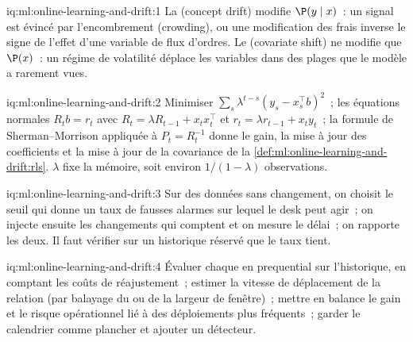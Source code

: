 \begin{solution}{iq:ml:online-learning-and-drift:1}
La  (concept drift) modifie $\P(y\mid x)$~: un signal est évincé par l'encombrement (crowding), ou une modification des frais inverse le signe de l'effet
d'une variable de flux d'ordres. Le  (covariate shift) ne modifie que $\P(x)$~: un régime de volatilité déplace les variables dans des plages que le modèle a rarement vues.
\end{solution}

\begin{solution}{iq:ml:online-learning-and-drift:2}
Minimiser $\sum_s\lambda^{t-s}(y_s - x_s^\top b)^2$~; les équations normales $R_tb = r_t$ avec $R_t = \lambda R_{t-1} + x_tx_t^\top$
et $r_t = \lambda r_{t-1} + x_ty_t$~; la formule de Sherman--Morrison appliquée à $P_t = R_t^{-1}$ donne le gain, la mise à jour des coefficients et la
mise à jour de la covariance de la \cref{def:ml:online-learning-and-drift:rls}. $\lambda$ fixe la mémoire, soit environ $1/(1-\lambda)$
observations.
\end{solution}

\begin{solution}{iq:ml:online-learning-and-drift:3}
Sur des données sans changement, on choisit le seuil qui donne un taux de fausses alarmes sur lequel le desk peut agir~; on injecte ensuite les changements qui
comptent et on mesure le délai~; on rapporte les deux. Il faut vérifier sur un historique réservé que le taux tient.
\end{solution}

\begin{solution}{iq:ml:online-learning-and-drift:4}
Évaluer chaque  en prequential sur l'historique, en comptant les coûts de réajustement~; estimer la vitesse de déplacement de la relation (par balayage du
 ou de la largeur de fenêtre)~; mettre en balance le gain et le risque opérationnel lié à des déploiements plus fréquents~; garder le
calendrier comme plancher et ajouter un détecteur.
\end{solution}

